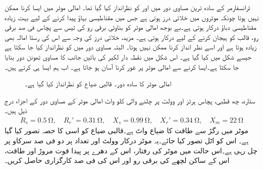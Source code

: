 ٹرانسفارمر کے سادہ ترین مساوی دور میں  اور  کو نظرانداز کیا گیا تھا۔ امالی موٹر میں ایسا کرنا ممکن نہیں ہوتا چونکہ موٹروں میں خلائی درز ہوتی ہے جس میں مقناطیسی بہاؤ پیدا کرنے کے لیے بہت زیادہ مقناطیسی دباؤ درکار ہوتی ہے۔بے بوجھ امالی موٹر کو بناوٹی برقی رو کی تیس سے پچاس فی صد برقی رو، قالب کو ہیجان کرنے کے لیے درکار ہوتی ہے۔ مزید، خلائی درز کی وجہ سے اس کی رستا امالہ بھی زیادہ ہوتا ہے اور اسے نظر انداز کرنا ممکن نہیں ہوتا۔ البتہ مساوی دور میں  کو نظرانداز کیا جا سکتا ہے جیسے شکل  میں کیا گیا ہے۔ اس شکل میں نقطہ دار لکیر کی بائیں جانب کا مساوی تھونن دور بنایا جا سکتا ہے۔ایسا کرنے سے امالی موٹر پر غور کرنا  آسان ہو جاتا ہے۔ اب ہم ایسا ہی کرتے ہیں۔
\begin{figure}
\centering
\caption{امالی موٹر کا سادہ دور۔ قالبی ضیاع کو نظرانداز کیا گیا ہے۔}
\label{شکل_امالی_ساکن_حصے_کا_تھونن_دور}
\end{figure}
%
ستارہ، چھ قطبی، پچاس ہرٹز اور   وولٹ پر چلنے والی   کلو واٹ امالی موٹر کے مساوی دور کے اجزاء درج ذیل ہیں۔
\begin{align*}
R_s= \SI{0.5}{\ohm}, \quad R_r'=\SI{0.31}{\ohm}, \quad X_s=\SI{0.99}{\ohm}, \quad X_r'=\SI{0.34}{\ohm}, \quad X_m=\SI{22}{\ohm} 
\end{align*}
موٹر میں رگڑ سے طاقت کا ضیاع   واٹ ہے۔قالبی ضیاع کو اسی کا حصہ تصور کیا گیا ہے۔ اس کو اٹل تصور کیا جائے۔یہ موٹر درکار وولٹ اور تعداد  پر دو فی صد سرکاو پر چل رہی ہے۔اس حالت میں موٹر کی رفتار، اس کے دھرے پر پیدا قوت مروڑ اور طاقت، اس کے ساکن لچھے کی  برقی رو اور اس کی فی صد کارگزاری حاصل کریں۔

